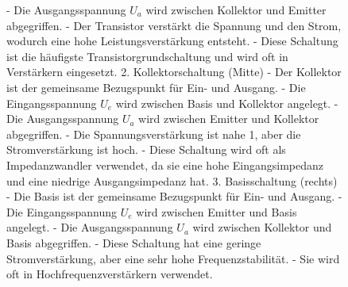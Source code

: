 {\begin{figure}[H]
\begin{minipage}[c]{0.32\textwidth}
{            - Die Ausgangsspannung \( U_a \) wird zwischen Kollektor und Emitter abgegriffen.  
            - Der Transistor verstärkt die Spannung und den Strom, wodurch eine hohe Leistungsverstärkung entsteht.  
            - Diese Schaltung ist die häufigste Transistorgrundschaltung und wird oft in Verstärkern eingesetzt.  
            2. Kollektorschaltung (Mitte)
            - Der Kollektor ist der gemeinsame Bezugspunkt für Ein- und Ausgang.  
            - Die Eingangsspannung \( U_e \) wird zwischen Basis und Kollektor angelegt.  
            - Die Ausgangsspannung \( U_a \) wird zwischen Emitter und Kollektor abgegriffen.  
            - Die Spannungsverstärkung ist nahe 1, aber die Stromverstärkung ist hoch.  
            - Diese Schaltung wird oft als Impedanzwandler verwendet, da sie eine hohe Eingangsimpedanz und eine niedrige Ausgangsimpedanz hat.  
            3. Basisschaltung (rechts)
            - Die Basis ist der gemeinsame Bezugspunkt für Ein- und Ausgang.  
            - Die Eingangsspannung \( U_e \) wird zwischen Emitter und Basis angelegt.  
            - Die Ausgangsspannung \( U_a \) wird zwischen Kollektor und Basis abgegriffen.  
            - Diese Schaltung hat eine geringe Stromverstärkung, aber eine sehr hohe Frequenzstabilität.  
            - Sie wird oft in Hochfrequenzverstärkern verwendet.}
        \end{minipage}
        \begin{minipage}[c]{0.36\textwidth}
        \raggedleft
            
\end{minipage}
\end{figure}}
